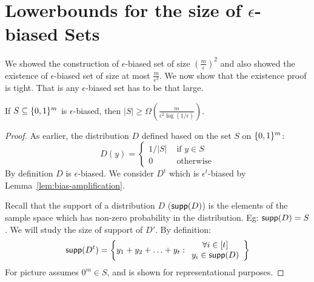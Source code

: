 \section{Lowerbounds for the size of $\epsilon$-biased Sets}

We showed the construction of $\epsilon$-biased set of size $\left(\frac{m}{\epsilon}\right)^2$ and also showed the existence of $\epsilon$-biased set of size at most $\frac{m}{\epsilon^2}$. We now show that the existence proof is tight. That is any $\epsilon$-biased set has to be that large.

\begin{theorem}
If $S \subseteq \{0,1\}^m$ is $\epsilon$-biased, then $|S| \ge \Omega\left(\frac{m}{\epsilon^2 \log{(1/\epsilon)}}\right)$.
\end{theorem}
\begin{proof}
As earlier, the distribution $D$ defined based on the set $S$ on $\{0,1\}^m$:
\[
D(y) = \left\{
\begin{array}{ll}
1/|S| & \textrm{ if $y \in S$} \\
0 & \textrm{ otherwise}
\end{array}
\right.
\]
\noindent By definition $D$  is $\epsilon$-biased. We consider $D^t$ which is $\epsilon^t$-biased by Lemma~\ref{lem:bias-amplification}.\\[-2mm]

\hspace{-6mm}\begin{minipage}{0.55\linewidth}
\vspace{-5mm}
Recall that the support of a distribution $D$ (${\mathsf{supp}}(D)$) is the elements of the sample space which has non-zero probability in the distribution. Eg: ${\mathsf{supp}}(D) = S$. We will study the size of support of $D'$. 
By definition:\\[-2mm]
$${\mathsf{supp}}(D^t) = \left\{ y_1+y_2+\ldots+y_t :
\begin{array}{c}
\forall i \in [t]\\ 
y_i \in {\mathsf{supp}}(D) 
\end{array}
\right\} $$
For picture assumes $0^m \in S$, and is shown for representational purposes.
\end{minipage}
\begin{minipage}{0.35\linewidth}
\vspace{1mm}
\end{minipage}


\end{proof}
